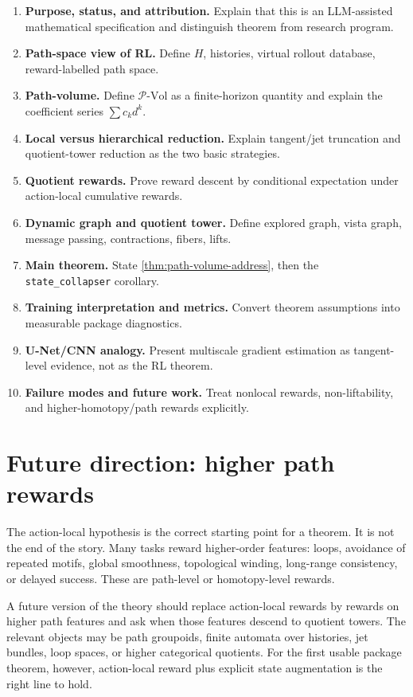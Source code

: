 \documentclass[11pt]{article}
\newcommand{\PVol}{\mathcal{P}\text{-}\mathrm{Vol}}
\begin{document}
\begin{enumerate}[label=\textbf{\arabic*.},leftmargin=1.2cm]
    \item \textbf{Purpose, status, and attribution.}  Explain that this is an LLM-assisted mathematical specification and distinguish theorem from research program.
    \item \textbf{Path-space view of RL.}  Define \(H\), histories, virtual rollout database, reward-labelled path space.
    \item \textbf{Path-volume.}  Define \(\PVol\) as a finite-horizon quantity and explain the coefficient series \(\sum c_kd^k\).
    \item \textbf{Local versus hierarchical reduction.}  Explain tangent/jet truncation and quotient-tower reduction as the two basic strategies.
    \item \textbf{Quotient rewards.}  Prove reward descent by conditional expectation under action-local cumulative rewards.
    \item \textbf{Dynamic graph and quotient tower.}  Define explored graph, vista graph, message passing, contractions, fibers, lifts.
    \item \textbf{Main theorem.}  State \cref{thm:path-volume-address}, then the \texttt{state\_collapser} corollary.
    \item \textbf{Training interpretation and metrics.}  Convert theorem assumptions into measurable package diagnostics.
    \item \textbf{U-Net/CNN analogy.}  Present multiscale gradient estimation as tangent-level evidence, not as the RL theorem.
    \item \textbf{Failure modes and future work.}  Treat nonlocal rewards, non-liftability, and higher-homotopy/path rewards explicitly.
\end{enumerate}

\section{Future direction: higher path rewards}

The action-local hypothesis is the correct starting point for a theorem.  It is not the end of the story.  Many tasks reward higher-order features: loops, avoidance of repeated motifs, global smoothness, topological winding, long-range consistency, or delayed success.  These are path-level or homotopy-level rewards.

A future version of the theory should replace action-local rewards by rewards on higher path features and ask when those features descend to quotient towers.  The relevant objects may be path groupoids, finite automata over histories, jet bundles, loop spaces, or higher categorical quotients.  For the first usable package theorem, however, action-local reward plus explicit state augmentation is the right line to hold.
\end{document}
